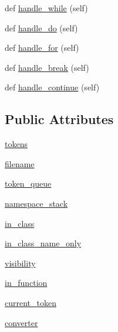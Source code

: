 \begin{DoxyCompactItemize}
\item 
def \hyperlink{classcpp_1_1ast_1_1_ast_builder_aac812e812ba2e5fbd80dde93be01a414}{handle\+\_\+while} (self)
\item 
def \hyperlink{classcpp_1_1ast_1_1_ast_builder_a540226b483513b423d4ec2c4f10b18f5}{handle\+\_\+do} (self)
\item 
def \hyperlink{classcpp_1_1ast_1_1_ast_builder_a0025c4d8ca779d69552e0947665eb1c4}{handle\+\_\+for} (self)
\item 
def \hyperlink{classcpp_1_1ast_1_1_ast_builder_a2b663a3e15e70b9d85bf17afb2bcf07a}{handle\+\_\+break} (self)
\item 
def \hyperlink{classcpp_1_1ast_1_1_ast_builder_a511eb003ed301a713a687e5293584077}{handle\+\_\+continue} (self)
\end{DoxyCompactItemize}
\subsection*{Public Attributes}
\begin{DoxyCompactItemize}
\item 
\hyperlink{classcpp_1_1ast_1_1_ast_builder_a1b21f8bef712e91862ccb6b1147cab0d}{tokens}
\item 
\hyperlink{classcpp_1_1ast_1_1_ast_builder_ad8b8f5788de55d6c7151e82af8b21115}{filename}
\item 
\hyperlink{classcpp_1_1ast_1_1_ast_builder_ae167f12797e7c02c1b60c11c83cdb22f}{token\+\_\+queue}
\item 
\hyperlink{classcpp_1_1ast_1_1_ast_builder_ab183aa48e4b6e116379f95eb3d11039c}{namespace\+\_\+stack}
\item 
\hyperlink{classcpp_1_1ast_1_1_ast_builder_a9edc1e10a3f005b463fd9316d83dd15d}{in\+\_\+class}
\item 
\hyperlink{classcpp_1_1ast_1_1_ast_builder_a376583354ab9afa308b7f34105bf3f4a}{in\+\_\+class\+\_\+name\+\_\+only}
\item 
\hyperlink{classcpp_1_1ast_1_1_ast_builder_a2f16b19846c405101235432d2666b614}{visibility}
\item 
\hyperlink{classcpp_1_1ast_1_1_ast_builder_ad5ac0612dfff44241033864832dbdfe3}{in\+\_\+function}
\item 
\hyperlink{classcpp_1_1ast_1_1_ast_builder_a38579523ccc1ae9d202ac722baea45fc}{current\+\_\+token}
\item 
\hyperlink{classcpp_1_1ast_1_1_ast_builder_ae8551cf0405bc6e367636b1f3b37d083}{converter}
\end{DoxyCompactItemize}


